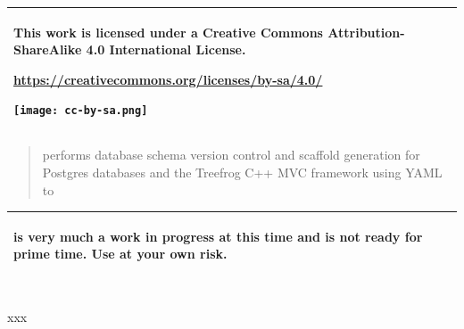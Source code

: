 \documentclass[]{article}
\title{}
\author{
	  Carbone, John\\
	\texttt{john@qlcorp.net}
}
\begin{document}
	

\maketitle
\begin{tabular}{|p{}|}
	\hline
	\rowcolor{LightYellow}
	\begin{center}
		This work is licensed under a Creative Commons Attribution-ShareAlike 4.0 International License.
	\end{center}
\begin{center}
	\url{https://creativecommons.org/licenses/by-sa/4.0/}
\end{center}
	\begin{center}
		\texttt{[image: cc-by-sa.png]}
	\end{center}\\
	\hline
\end{tabular}

\begin{abstract}
 performs database schema version control and scaffold generation for Postgres databases and the Treefrog C++ MVC framework using YAML to 
\end{abstract}

\begin{tabular}{|p{}|}
	\hline
	\rowcolor{LightRed}
	\begin{center}
		 is very much a work in progress at this time and is not ready for prime time. Use at your own risk.
	\end{center}\\
	\hline
\end{tabular}
\\
xxx
\end{document}

